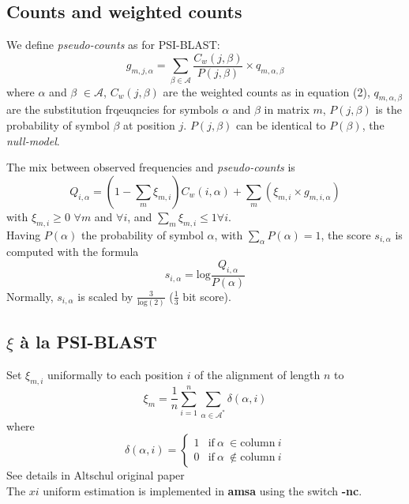 \documentclass[a4paper,10pt,twoside]{scrartcl}
\begin{document}
\subsection{Counts and weighted counts}
We define {\em pseudo-counts} as for PSI-BLAST:
\begin{equation}
g_{m,j,\alpha} = \sum_{\beta \in \mathcal{A}}\frac{C_w(j,\beta)}{P(j,\beta)} \times q_{m,\alpha,\beta} 
\end{equation}
where $\alpha$ and $\beta$ $\in \mathcal{A}$, $C_w(j,\beta)$ are the weighted counts as in equation (2), $q_{m,\alpha,\beta}$ are the substitution
frqeuqncies for symbols $\alpha$ and $\beta$ in matrix $m$, $P(j,\beta)$ is the probability of symbol $\beta$ at position $j$. $P(j,\beta)$ can be
identical to $P(\beta)$, the {\em null-model}.

The mix between observed frequencies and {\em pseudo-counts} is
\begin{equation}
Q_{i,\alpha} =  (1 - \sum_{m}\xi_{m,i})C_w(i,\alpha) + \sum_{m}(\xi_{m,i} \times g_{m,i,\alpha})
\end{equation}
with $\xi_{m,i} \ge 0$ $\forall m$ and $\forall i$, and $\sum_{m}\xi_{m,i} \le 1 \forall i$.\\
Having $P(\alpha)$ the probability of symbol $\alpha$, with $\sum_{\alpha}P(\alpha)=1$, the score $s_{i,\alpha}$ is computed with the formula
\begin{equation}
s_{i,\alpha} = \mathrm{log}\frac{Q_{i,\alpha}}{P(\alpha)}
\end{equation}
Normally, $s_{i,\alpha}$ is scaled by $\frac{3}{\mathrm{log}(2)}$ ($\frac{1}{3}$ bit score).

\subsection{$\xi$ \`a la PSI-BLAST}
Set $\xi_{m,i}$ uniformally to each position $i$ of the alignment of length $n$ to
\begin{equation}
\xi_m = \frac{1}{n}\sum_{i=1}^{n}\sum_{\alpha \in \mathcal{A^*}}\delta(\alpha,i)
\end{equation}
where
\begin{equation}
\delta(\alpha,i) = \left\{ \begin{array}{ll} 
						               1& \mathrm{if}\ \alpha\ \in \mathrm{column}\ i\\
						               0& \mathrm{if}\ \alpha\ \notin \mathrm{column}\ i
													 \end{array} \right. 
\end{equation}
See details in Altschul original paper \cite{Altschul97}\\
The $xi$ uniform estimation is implemented in {\bf amsa} using the switch {\bf -nc}.
\end{document}

